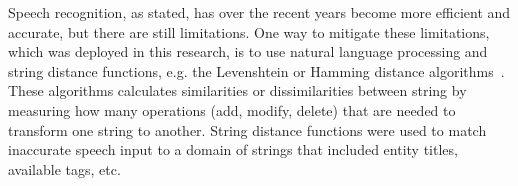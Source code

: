 \documentclass[conference]{IEEEtran}
\begin{document}
Speech recognition, as stated, has over the recent years become more efficient and accurate, but there are still limitations.
One way to mitigate these limitations, which was deployed in this research, is to use natural language processing and string distance functions, e.g. the Levenshtein or Hamming distance algorithms~\cite{levenshtein,hamming}. 
These algorithms calculates similarities or dissimilarities between string by measuring how many operations (add, modify, delete) that are needed to transform one string to another.
String distance functions were used to match inaccurate speech input to a domain of strings that included entity titles, available tags, etc.



\end{document}
